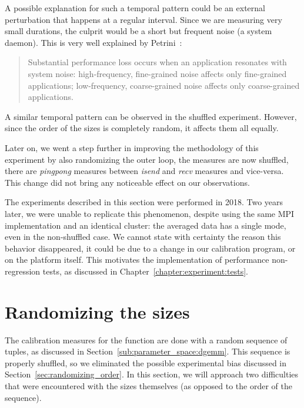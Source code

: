         A possible explanation for such a temporal pattern could be an external perturbation that happens at a regular
        interval. Since we are measuring very small durations, the culprit would be a short but frequent noise (\eg a
        system daemon). This is very well explained by Petrini~\etal\cite{Petrini_2003}:
        \begin{quote}
            Substantial performance loss occurs when an application resonates with system noise: high-frequency,
            fine-grained noise affects only fine-grained applications; low-frequency, coarse-grained noise affects only
            coarse-grained applications.
        \end{quote}

        A similar temporal pattern can be observed in the shuffled experiment. However, since the order of the sizes is
        completely random, it affects them all equally.

        Later on, we went a step further in improving the methodology of this experiment by also randomizing the outer
        loop, \ie the measures are now shuffled, there are \emph{pingpong} measures between \emph{isend} and \emph{recv}
        measures and vice-versa. This change did not bring any noticeable effect on our observations.

        The experiments described in this section were performed in 2018. Two years later, we were unable to replicate
        this phenomenon, despite using the same MPI implementation and an identical cluster: the averaged data has a
        single mode, even in the non-shuffled case. We cannot state with certainty the reason this behavior disappeared,
        it could be due to a change in our calibration program, or on the platform itself. This motivates the
        implementation of performance non-regression tests, as discussed in Chapter~\ref{chapter:experiment:tests}.

    \section{Randomizing the sizes}%
    \label{sec:randomizing_sizes}
        The calibration measures for the \dgemm function are done with a random sequence of tuples, as discussed in
        Section~\ref{sub:parameter_space:dgemm}. This sequence is properly shuffled, so we eliminated the possible
        experimental bias discussed in Section~\ref{sec:randomizing_order}. In this section, we will approach two
        difficulties that were encountered with the sizes themselves (as opposed to the order of the sequence).

